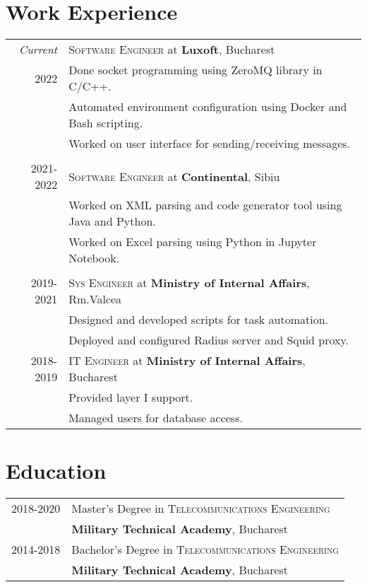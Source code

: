 \documentclass[a4paper,12pt]{article}
\begin{document}
\section{Work Experience}
\begin{tabular}{r|p{12cm}}
\emph{Current}
&\textsc{Software Engineer} at \textbf{Luxoft}, Bucharest\\
\textsc{2022}
&\footnotesize{Done socket programming using ZeroMQ library in C/C++.}\\
&\footnotesize{Automated environment configuration using Docker and Bash scripting.}\\
&\footnotesize{Worked on user interface for sending/receiving messages.}\\
\multicolumn{2}{c}{}\\
\textsc{2021-2022}
&\textsc{Software Engineer} at \textbf{Continental}, Sibiu\\
&\footnotesize{Worked on XML parsing and code generator tool using Java and Python.}\\
&\footnotesize{Worked on Excel parsing using Python in Jupyter Notebook.}\\
\multicolumn{2}{c}{}\\
\textsc{2019-2021} 
  &\textsc{Sys Engineer} at \textbf{Ministry of Internal Affairs}, Rm.Valcea\\
&\footnotesize{
  Designed and developed scripts for task automation.}\\
&\footnotesize{
  Deployed and configured Radius server and Squid proxy.}\\
\textsc{2018-2019} 
&\textsc{IT Engineer} at \textbf{Ministry of Internal Affairs}, Bucharest\\
&\footnotesize{Provided layer I support.}\\
&\footnotesize{Managed users for database access.}\\
\end{tabular}

\section{Education}
\begin{tabular}{rl}
\textsc{2018-2020}&Master's Degree in 
  \textsc{Telecommunications Engineering}\\
  &\textbf{Military Technical Academy}, Bucharest\\
\textsc{2014-2018}&Bachelor's Degree in
  \textsc{Telecommunications Engineering}\\
  &\textbf{Military Technical Academy}, Bucharest\\
\end{tabular}
\end{document}
